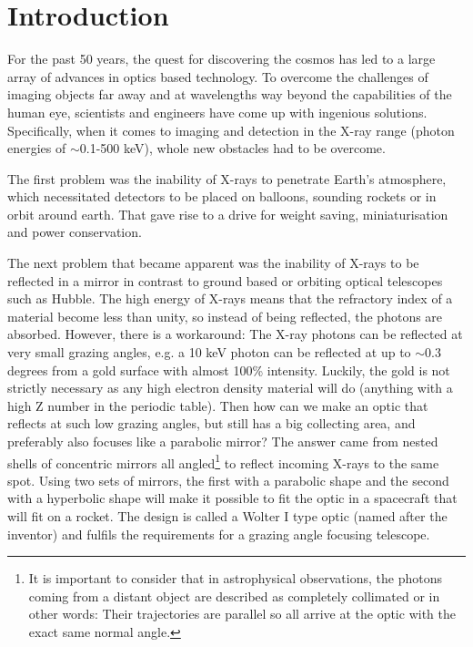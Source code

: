 \chapter{Introduction}
For the past 50 years, the quest for discovering the cosmos has led to a large array of advances in optics based technology. To overcome the challenges of imaging objects far away and at wavelengths way beyond the capabilities of the human eye, scientists and engineers have come up with ingenious solutions. Specifically, when it comes to imaging and detection in the X-ray range (photon energies of $\sim$0.1-500 keV), whole new obstacles had to be overcome.

The first problem was the inability of X-rays to penetrate Earth's atmosphere, which necessitated detectors to be placed on balloons, sounding rockets or in orbit around earth. That gave rise to a drive for weight saving, miniaturisation and power conservation.

The next problem that became apparent was the inability of X-rays to be reflected in a mirror in contrast to ground based or orbiting optical telescopes such as Hubble. The high energy of X-rays means that the refractory index of a material become less than unity, so instead of being reflected, the photons are absorbed. However, there is a workaround: The X-ray photons can be reflected at very small grazing angles, e.g. a 10 keV photon can be reflected at up to $\sim$0.3 degrees from a gold surface with almost 100\% intensity. Luckily, the gold is not strictly necessary as any high electron density material will do (anything with a high Z number in the periodic table). Then how can we make an optic that reflects at such low grazing angles, but still has a big collecting area, and preferably also focuses like a parabolic mirror? The answer came from nested shells of concentric mirrors all angled\footnote{It is important to consider that in astrophysical observations, the photons coming from a distant object are described as completely collimated or in other words: Their trajectories are parallel so all arrive at the optic with the exact same normal angle.} to reflect incoming X-rays to the same spot. Using two sets of mirrors, the first with a parabolic shape and the second with a hyperbolic shape will make it possible to fit the optic in a spacecraft that will fit on a rocket. The design is called a Wolter I type optic\cite{Wolter:1952gt,Wolter:1952ih} (named after the inventor) and fulfils the requirements for a grazing angle focusing telescope.

